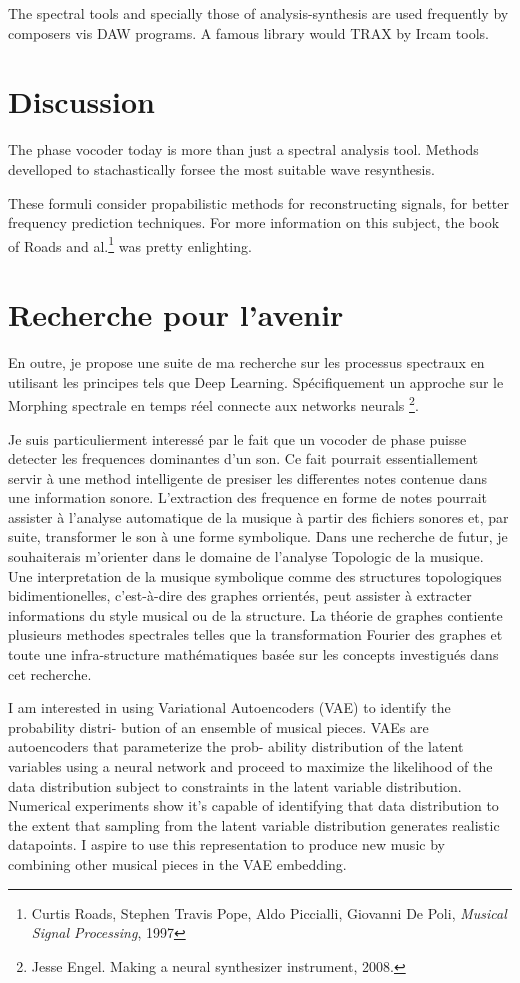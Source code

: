 The spectral tools and specially those of analysis-synthesis are used frequently by composers vis DAW programs. A famous library would TRAX by Ircam tools. 

\section{Discussion}

The phase vocoder today is more than just a spectral analysis tool. Methods develloped to stachastically forsee the most suitable wave resynthesis.

These formuli consider propabilistic methods for reconstructing signals, for better frequency prediction techniques. For more information on this subject, the book of Roads and al.\footnote{Curtis Roads, Stephen Travis Pope, Aldo Piccialli, Giovanni De Poli, \textit{Musical Signal Processing}, 1997 \nocite{Roads97}} was pretty enlighting.

\section{Recherche pour l'avenir}

En outre, je propose une suite de ma recherche sur les processus spectraux en utilisant les principes tels que Deep Learning. Spécifiquement un approche sur le Morphing spectrale en temps réel connecte aux networks neurals \footnote{Jesse Engel. Making a neural synthesizer instrument, 2008.}. 

Je suis particulierment interessé par le fait que un vocoder de phase puisse detecter les frequences dominantes d'un son. Ce fait pourrait essentiallement servir à une method intelligente de presiser les differentes notes contenue dans une information sonore. L'extraction des frequence en forme de notes pourrait assister à l'analyse automatique de la musique à partir des fichiers sonores et, par suite, transformer le son à une forme symbolique. Dans une recherche de futur, je souhaiterais m'orienter dans le domaine de l'analyse Topologic de la musique. Une interpretation de la musique symbolique comme des structures topologiques bidimentionelles, c'est-à-dire des graphes orrientés, peut assister à extracter informations du style musical ou de la structure. La théorie de graphes contiente plusieurs methodes spectrales telles que la transformation Fourier des graphes et toute une infra-structure mathématiques basée sur les concepts investigués dans cet recherche.

I am interested in using Variational Autoencoders (VAE) to identify the probability distri-
bution of an ensemble of musical pieces. VAEs are autoencoders that parameterize the prob-
ability distribution of the latent variables using a neural network and proceed to maximize
the likelihood of the data distribution subject to constraints in the latent variable distribution.
Numerical experiments show it’s capable of identifying that data distribution to the extent
that sampling from the latent variable distribution generates realistic datapoints. I aspire to
use this representation to produce new music by combining other musical pieces in the VAE
embedding.

